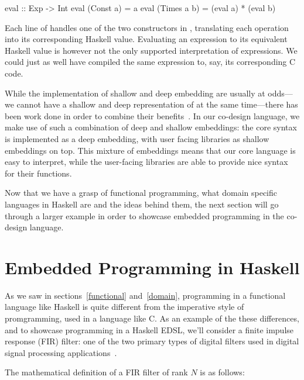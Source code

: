 \documentclass[../paper.tex]{subfiles}
\begin{document}
\begin{code}
eval :: Exp -> Int
eval (Const a)   = a
eval (Times a b) = (eval a) * (eval b)
\end{code}

\noindent Each line of  handles one of the two constructors in , translating each operation into its corresponding Haskell value. Evaluating an expression to its equivalent Haskell value is however not the only supported interpretation of expressions. We could just as well have compiled the same expression to, say, its corresponding C code.

While the implementation of shallow and deep embedding are usually at odds---we cannot have a shallow and deep representation of  at the same time---there has been work done in order to combine their benefits~\cite{svenningsson2012}. In our co-design language, we make use of such a combination of deep and shallow embeddings: the core syntax is implemented as a deep embedding, with user facing libraries as shallow embeddings on top. This mixture of embeddings means that our core language is easy to interpret, while the user-facing libraries are able to provide nice syntax for their functions.

Now that we have a grasp of functional programming, what domain specific languages in Haskell are and the ideas behind them, the next section will go through a larger example in order to showcase embedded programming in the co-design language.

\section{Embedded Programming in Haskell}
\label{embedded}

As we saw in sections~\ref{functional} and~\ref{domain}, programming in a functional language like Haskell is quite different from the imperative style of promgramming, used in a language like C. As an example of the these differences, and to showcase programming in a Haskell EDSL, we'll consider a finite impulse response (FIR) filter: one of the two primary types of digital filters used in digital signal processing applications~\cite{oppenheim1989}.


The mathematical definition of a FIR filter of rank $N$ is as follows:
\end{document}
